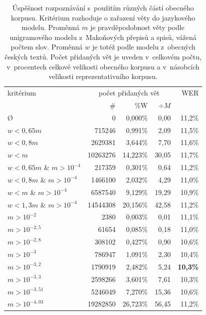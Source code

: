 \begin{table}[htpb]
\begin{center}
\begin{tabular}{|l|r r r|r|}
\hline
kritérium & \multicolumn{3}{c|}{počet přidaných vět} & WER \\
                        &       \# &  \%W       & $\div{}M$ & \\
\hline
Ø                       &        0 &  0,000\% &  0,00 & 11,2\% \\
$w<0,65m$               &   715246 &  0,991\% &  2,09 & 11,5\% \\
$w<0,8m$                &  2629381 &  3,644\% &  7,70 & 11,6\% \\
$w<m$                   & 10263276 & 14,223\% & 30,05 & 11,7\% \\
$w<0,65m$ \& $m>10^{-4}$&   217359 &  0,301\% &  0,64 & 11,2\% \\
$w<0,8m$ \& $m>10^{-4}$ &  1466100 &  2,032\% &  4,29 & 11,0\% \\
$w<m$ \& $m>10^{-4}$    &  6587540 &  9,129\% & 19,29 & 10,9\% \\
$w<1,3m$ \& $m>10^{-4}$ & 14544308 & 20,156\% & 42,58 & 11,2\% \\
$m>10^{-2}$             &     2380 &  0,003\% &  0,01 & 11,1\% \\
$m>10^{-2,5}$           &    61654 &  0,085\% &  0,18 & 11,0\% \\
$m>10^{-2,8}$           &   308102 &  0,427\% &  0,90 & 10,6\% \\
$m>10^{-3}$             &   786947 &  1,091\% &  2,30 & 10,4\% \\
$m>10^{-3,2}$           &  1790919 &  2,482\% &  5,24 & \textbf{10,3\%} \\
$m>10^{-3,3}$           &  2598266 &  3,601\% &  7,61 & 10,3\% \\
$m>10^{-3,51}$          &  5246049 &  7,270\% & 15,36 & 10,6\% \\
$m>10^{-4,03}$          & 19282850 & 26,723\% & 56,45 & 11,2\% \\
\hline
\end{tabular}
\caption{Úspěšnost rozpoznávání s~použitím různých částí obecného korpusu.
Kritérium rozhoduje o zařazení věty do jazykového modelu. Proměnná $m$ je
pravděpodobnost věty podle unigramového modelu z~Makoňových přepisů a spisů,
vážená počtem slov. Proměnná $w$ je totéž podle modelu z~obecných českých textů.
Počet přidaných vět je uveden v~celkovém počtu, v~procentech celkové velikosti
obecného korpusu a v~násobcích velikosti reprezentativního korpusu.}\label{tab:lm-plz-scores}
\end{center}
\end{table}

